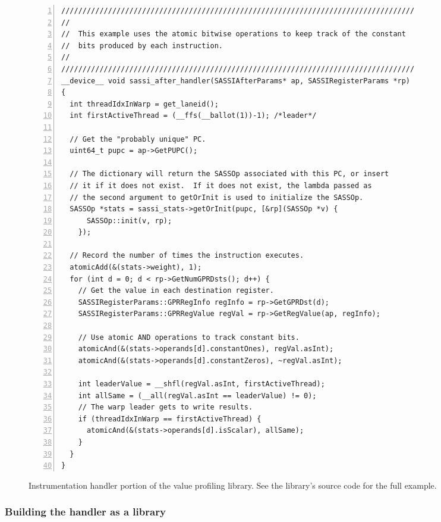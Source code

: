\begin{figure*}[h!]
\begin{lstlisting}[numbers=left,numbersep=4pt]
///////////////////////////////////////////////////////////////////////////////////
//
//  This example uses the atomic bitwise operations to keep track of the constant
//  bits produced by each instruction.
//
///////////////////////////////////////////////////////////////////////////////////
__device__ void sassi_after_handler(SASSIAfterParams* ap, SASSIRegisterParams *rp)
{
  int threadIdxInWarp = get_laneid();
  int firstActiveThread = (__ffs(__ballot(1))-1); /*leader*/

  // Get the "probably unique" PC.
  uint64_t pupc = ap->GetPUPC();

  // The dictionary will return the SASSOp associated with this PC, or insert
  // it if it does not exist.  If it does not exist, the lambda passed as
  // the second argument to getOrInit is used to initialize the SASSOp.
  SASSOp *stats = sassi_stats->getOrInit(pupc, [&rp](SASSOp *v) {
      SASSOp::init(v, rp);
    });
  
  // Record the number of times the instruction executes.
  atomicAdd(&(stats->weight), 1);
  for (int d = 0; d < rp->GetNumGPRDsts(); d++) {
    // Get the value in each destination register.
    SASSIRegisterParams::GPRRegInfo regInfo = rp->GetGPRDst(d);
    SASSIRegisterParams::GPRRegValue regVal = rp->GetRegValue(ap, regInfo); 

    // Use atomic AND operations to track constant bits.
    atomicAnd(&(stats->operands[d].constantOnes), regVal.asInt); 
    atomicAnd(&(stats->operands[d].constantZeros), ~regVal.asInt);

    int leaderValue = __shfl(regVal.asInt, firstActiveThread); 
    int allSame = (__all(regVal.asInt == leaderValue) != 0);
    // The warp leader gets to write results.
    if (threadIdxInWarp == firstActiveThread) { 
      atomicAnd(&(stats->operands[d].isScalar), allSame);
    }
  }
}
\end{lstlisting}
\caption{Instrumentation handler portion of the value profiling
  library.  See the library's source code for the full example.}
\label{fig:handler-example4}
\end{figure*}

\subsubsection{Building the handler as a library}

